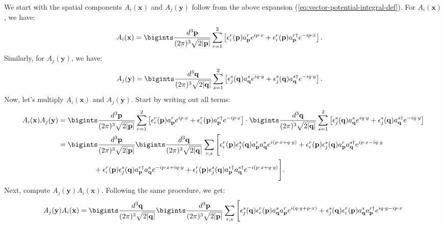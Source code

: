 \begin{enumerate}
We start with the spatial components $A_i(\mathbf{x})$ and $A_j(\mathbf{y})$ follow from the above expansion (\ref{eq:vector-potential-integral-def}). For $A_i(\mathbf{x})$, we have:
\begin{align}
    A_i(\mathbf{x}) &= \bigints\frac{d^3 \mathbf{p}}{(2\pi)^3 \sqrt{2|\mathbf{p}|}} \sum_{r=1}^2 \left[ \epsilon_i^r(\mathbf{p}) a^r_{\mathbf{p}} e^{i p \cdot x} + \epsilon_i^r(\mathbf{p}) a^{r\dagger}_{\mathbf{p}} e^{-i p \cdot x} \right]. \label{eq:A_i(x)-form}
\end{align}
Similarly, for $A_j(\mathbf{y})$, we have:
\begin{align}
    A_j(\mathbf{y}) &= \bigints\frac{d^3 \mathbf{q}}{(2\pi)^3 \sqrt{2|\mathbf{q}|}} \sum_{s=1}^2 \left[ \epsilon_j^s(\mathbf{q}) a^s_{\mathbf{q}} e^{i q \cdot y} + \epsilon_j^s(\mathbf{q}) a^{s\dagger}_{\mathbf{q}} e^{-i q \cdot y} \right]. \label{eq:A_i(y)-form}
\end{align}
Now, let’s multiply $A_i(\mathbf{x})$ and $A_j(\mathbf{y})$. Start by writing out all terms:
\begin{align}
    A_i(\mathbf{x}) A_j(\mathbf{y}) &= \bigints\frac{d^3 \mathbf{p}}{(2\pi)^3 \sqrt{2|\mathbf{p}|}} \sum_{r=1}^2 \left[ \epsilon_i^r(\mathbf{p}) a^r_{\mathbf{p}} e^{i p \cdot x} + \epsilon_i^r(\mathbf{p}) a^{r\dagger}_{\mathbf{p}} e^{-i p \cdot x} \right]\cdot\bigints\frac{d^3 \mathbf{q}}{(2\pi)^3 \sqrt{2|\mathbf{q}|}} \sum_{s=1}^2 \left[ \epsilon_j^s(\mathbf{q}) a^s_{\mathbf{q}} e^{i q \cdot y} + \epsilon_j^s(\mathbf{q}) a^{s\dagger}_{\mathbf{q}} e^{-i q \cdot y} \right]\notag\\
    &= \bigints\frac{d^3 \mathbf{p}}{(2\pi)^3 \sqrt{2|\mathbf{p}|}} \bigints\frac{d^3 \mathbf{q}}{(2\pi)^3 \sqrt{2|\mathbf{q}|}} \sum_{r,s} \Bigg[ \epsilon_i^r(\mathbf{p}) \epsilon_j^s(\mathbf{q}) a^r_{\mathbf{p}} a^s_{\mathbf{q}} e^{i (p \cdot x + q \cdot y)} + \epsilon_i^r(\mathbf{p}) \epsilon_j^s(\mathbf{q}) a^r_{\mathbf{p}} a^{s\dagger}_{\mathbf{q}} e^{i p \cdot x - i q \cdot y} \nonumber \\
    &\hspace{50pt} + \epsilon_i^r(\mathbf{p}) \epsilon_j^s(\mathbf{q}) a^{r\dagger}_{\mathbf{p}} a^s_{\mathbf{q}} e^{-i p \cdot x + i q \cdot y} + \epsilon_i^r(\mathbf{p}) \epsilon_j^s(\mathbf{q}) a^{r\dagger}_{\mathbf{p}} a^{s\dagger}_{\mathbf{q}} e^{-i (p \cdot x + q \cdot y)} \Bigg]. 
\end{align}
Next, compute $A_j(\mathbf{y}) A_i(\mathbf{x})$. Following the same procedure, we get:
\begin{align}
    A_j(\mathbf{y}) A_i(\mathbf{x}) &= \bigints\frac{d^3 \mathbf{q}}{(2\pi)^3 \sqrt{2|\mathbf{q}|}} \bigints\frac{d^3 \mathbf{p}}{(2\pi)^3 \sqrt{2|\mathbf{p}|}} \sum_{r,s} \Bigg[ \epsilon_j^s(\mathbf{q}) \epsilon_i^r(\mathbf{p}) a^s_{\mathbf{q}} a^r_{\mathbf{p}} e^{i (q \cdot y + p \cdot x)} + \epsilon_j^s(\mathbf{q}) \epsilon_i^r(\mathbf{p}) a^s_{\mathbf{q}} a^{r\dagger}_{\mathbf{p}} e^{i q \cdot y - i p \cdot x} \nonumber \\

\end{align}
\end{enumerate}

